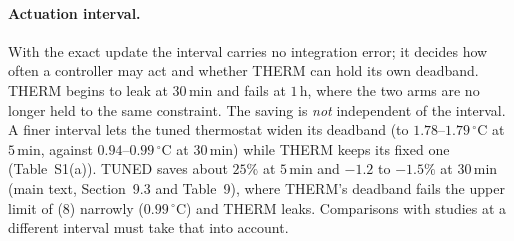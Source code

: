 \documentclass[11pt]{article}
\begin{document}
\paragraph{Actuation interval.} With the exact update the interval carries no
integration error; it decides how often a controller may act and whether THERM can hold its own deadband. THERM begins to leak at $30\,$min and fails at $1\,$h, where the two arms are no longer held to the same constraint. The saving is \emph{not} independent of the interval. A finer interval lets the tuned thermostat widen its deadband (to $1.78$--$1.79\,^\circ$C at $5\,$min, against $0.94$--$0.99\,^\circ$C at $30\,$min) while THERM keeps its fixed one (Table~S1(a)). TUNED saves about $25\%$ at $5\,$min and $-1.2$ to $-1.5\%$ at $30\,$min (main text, Section~9.3 and Table~9), where THERM's deadband fails the upper limit of (8) narrowly ($0.99\,^\circ$C) and THERM leaks. Comparisons with studies at a different interval must take that into account.
\end{document}
